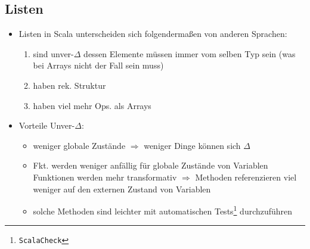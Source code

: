 \subsection{Listen}
\begin{itemize}
  \item Listen in Scala unterscheiden sich folgendermaßen von
  anderen Sprachen: \begin{enumerate}
    \item sind unver-$\Delta$ \und dessen Elemente müssen immer
    vom selben Typ sein (was bei Arrays nicht der Fall sein
    muss)
    \item haben rek. Struktur
    \item haben viel mehr Ops. als Arrays
  \end{enumerate}
  
  
  
  \item Vorteile Unver-$\Delta$:
  \begin{itemize}
    \item weniger globale Zustände $\Rightarrow$ weniger Dinge
    können sich $\Delta$
    \item Fkt. werden weniger anfällig für globale Zustände von
    Variablen 
    \und Funktionen werden mehr transformativ $\Rightarrow$ Methoden
    referenzieren viel weniger auf den externen Zustand von
    Variablen
    \item solche Methoden sind leichter mit automatischen 
    Tests\footnote{\texttt{ScalaCheck}} durchzuführen
  \end{itemize}
\end{itemize}


